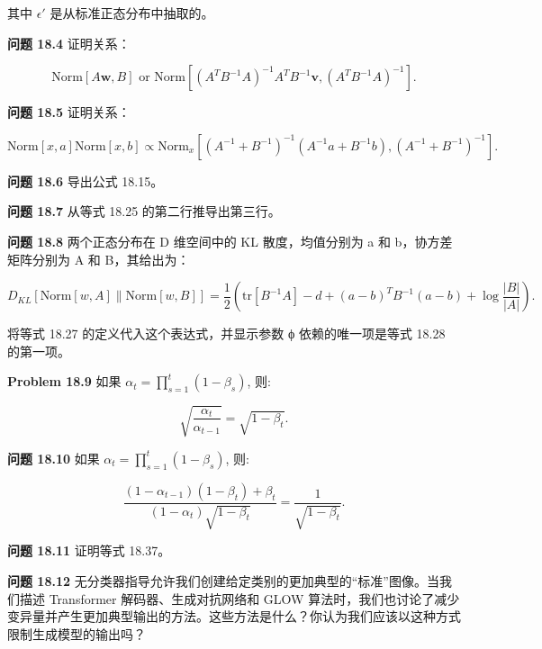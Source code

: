 其中 \(\epsilon'\) 是从标准正态分布中抽取的。

\textbf{问题 18.4} 证明关系：

\[
\text{Norm}[A\mathbf{w}, B] \text{ or Norm} \left[ (A^T B^{-1} A)^{-1} A^T B^{-1}\mathbf{v}, (A^T B^{-1} A)^{-1} \right]. \tag{18.45}
\]

\textbf{问题 18.5} 证明关系：

\[
\text{Norm}[x, a] \text{Norm}[x, b] \propto \text{Norm}_x \left[ (A^{-1} + B^{-1})^{-1}(A^{-1}a + B^{-1}b), (A^{-1} + B^{-1})^{-1} \right]. \tag{18.46}
\]

\textbf{问题 18.6} 导出公式 18.15。

\textbf{问题 18.7} 从等式 18.25 的第二行推导出第三行。

\textbf{问题 18.8} 两个正态分布在 D 维空间中的 KL 散度，均值分别为 a 和 b，协方差矩阵分别为 A 和 B，其给出为：

\[
D_{KL} [\text{Norm}[w, A] \| \text{Norm}[w, B]] = \frac{1}{2} \left( \text{tr}[B^{-1}A] - d + (a - b)^T B^{-1}(a - b) + \log \frac{|B|}{|A|} \right). \tag{18.47}
\]

将等式 18.27 的定义代入这个表达式，并显示参数 ϕ 依赖的唯一项是等式 18.28 的第一项。

\textbf{Problem 18.9} 如果 \(\alpha_t = \prod_{s=1}^{t} (1 - \beta_s)\), 则:

\[
\sqrt{\frac{\alpha_t}{\alpha_{t-1}}} = \sqrt{1 - \beta_t}. \tag{18.48}
\]

\textbf{问题 18.10} 如果 \(\alpha_t = \prod_{s=1}^{t} (1 - \beta_s)\), 则:

\[
\frac{(1 - \alpha_{t-1})(1 - \beta_t) + \beta_t}{(1 - \alpha_t)\sqrt{1 - \beta_t}} = \frac{1}{\sqrt{1 - \beta_t}}. \tag{18.49}
\]

\textbf{问题 18.11} 证明等式 18.37。

\textbf{问题 18.12} 无分类器指导允许我们创建给定类别的更加典型的“标准”图像。当我们描述 Transformer 解码器、生成对抗网络和 GLOW 算法时，我们也讨论了减少变异量并产生更加典型输出的方法。这些方法是什么？你认为我们应该以这种方式限制生成模型的输出吗？
